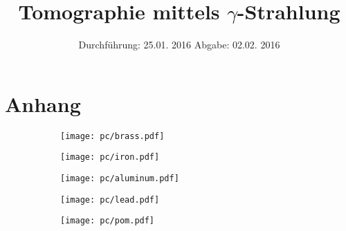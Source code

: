 

\subject{Fortgeschrittenen Praktikum V14}
\title{Tomographie mittels \texorpdfstring{$\gamma$}{Gamma}-Strahlung}
\date{
  Durchführung: 25.01. 2016
  \hspace{3em}
  Abgabe: 02.02. 2016
}



\maketitle
\thispagestyle{empty}
\tableofcontents
\newpage






\printbibliography

\newpage
\section{Anhang}
\begin{figure}[p]
  \centering
\begin{subfigure}{0.7\textwidth}
  \centering
  \texttt{[image: pc/brass.pdf]}
\end{subfigure}
\begin{subfigure}{0.7\textwidth}
  \centering
  \texttt{[image: pc/iron.pdf]}
\end{subfigure}
\begin{subfigure}{0.7\textwidth}
  \centering
  \texttt{[image: pc/aluminum.pdf]}
\end{subfigure}
\end{figure}
\begin{figure}[p]
  \centering
\begin{subfigure}{0.7\textwidth}
  \centering
  \texttt{[image: pc/lead.pdf]}
\end{subfigure}
\centering
\begin{subfigure}{0.7\textwidth}
  \centering
  \texttt{[image: pc/pom.pdf]}
\end{subfigure}
\end{figure}


